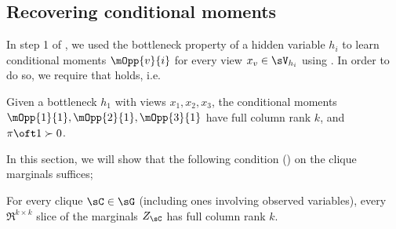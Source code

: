 \subsection{Recovering conditional moments}

In step 1 of \LearnMarginals, we used the bottleneck property of a hidden
  variable $h_i$ to learn conditional moments $\mOpp{v}{i}$ for every
  view $x_v \in \sV_{h_i}$ using \TensorFactorize. 
In order to do so, we require that  holds, i.e.
\begin{assumption*}
  Given a bottleneck $h_1$ with views $x_1, x_2, x_3$, the conditional
  moments $\mOpp{1}{1}, \mOpp{2}{1}, \mOpp{3}{1}$ have full column rank
  $k$, and $\pi\oft 1 \succ 0$.
\end{assumption*}

In this section, we will show that the following condition
  () on the clique marginals suffices;
\begin{assumption*}
For every clique $\sC \in \sG$ (including ones involving observed variables),
every $\Re^{k \times k}$ slice of the marginals $Z_\sC$ has full column rank $k$.
\end{assumption*}

%
%
%
%
%

